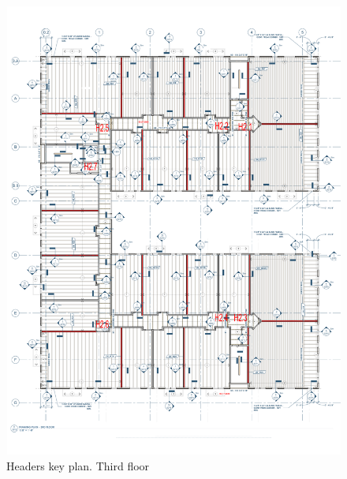 \begin{figure}
  \begin{center}
  \includegraphics[width=120mm]{figures/headers/headers_key_plan_3rd_floor}
  \end{center}
  \caption{Headers key plan. Third floor}\label{fg_headers_key_plan_3rd_floor}
\end{figure}

